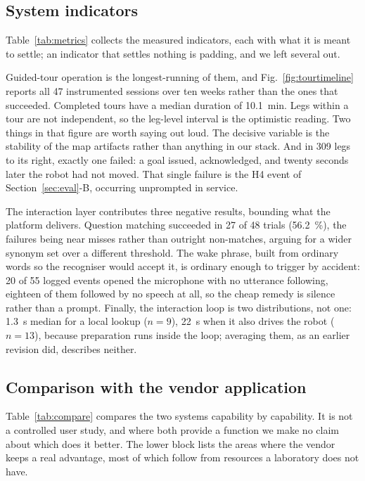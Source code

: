 

\subsection{System indicators}

Table~\ref{tab:metrics} collects the measured indicators, each with what it is meant to settle;
an indicator that settles nothing is padding, and we left several out.

Guided-tour operation is the longest-running of them, and Fig.~\ref{fig:tourtimeline} reports all
\num{47} instrumented sessions over ten weeks rather than the ones that succeeded. Completed tours
have a median duration of \SI{10.1}{\minute}. Legs within a tour are not independent, so the
leg-level interval is the optimistic reading. Two things in that figure are worth saying out loud.
The decisive variable is the stability of the map artifacts rather than anything in our stack.
And in \num{309} legs to its right, exactly one failed: a goal issued, acknowledged, and twenty
seconds later the robot had not moved. That single failure is the H4 event of
Section~\ref{sec:eval}-B, occurring unprompted in service.




The interaction layer contributes three negative results, bounding what the platform delivers.
Question matching succeeded in 27 of 48 trials (\SI{56.2}{\percent}), the failures being near
misses rather than outright non-matches, arguing for a wider synonym set over a different
threshold. The wake phrase, built from ordinary words so the recogniser would accept it, is
ordinary enough to trigger by accident: \num{20} of \num{55} logged events opened the microphone
with no utterance following, eighteen of them followed by no speech at all, so the cheap remedy
is silence rather than a prompt. Finally, the interaction loop is two distributions, not one:
\SI{1.3}{\second} median for a local lookup ($n=9$), \SI{22}{\second} when it also drives the
robot ($n=13$), because preparation runs inside the loop; averaging them, as an earlier revision
did, describes neither.

\FloatBarrier

\subsection{Comparison with the vendor application}

Table~\ref{tab:compare} compares the two systems capability by capability. It is not a
controlled user study, and where both provide a function we make no claim about which does it
better. The lower block lists the areas where the vendor keeps a real advantage, most of which
follow from resources a laboratory does not have.


